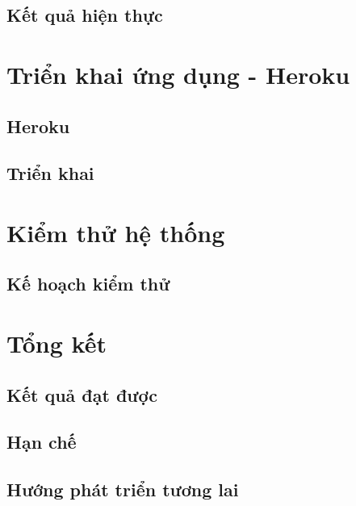 \documentclass[a4paper,12pt,fleqn,print,oneside]{extarticle}
\begin{document}
\subsection{Kết quả hiện thực}


\newpage
\section{Triển khai ứng dụng - Heroku}
\subsection{Heroku}


\subsection{Triển khai}



\newpage
\section{Kiểm thử hệ thống}


\subsection{Kế hoạch kiểm thử}




\newpage
\section{Tổng kết}
\subsection{Kết quả đạt được}


\subsection{Hạn chế}


\subsection{Hướng phát triển tương lai}

\end{document}
